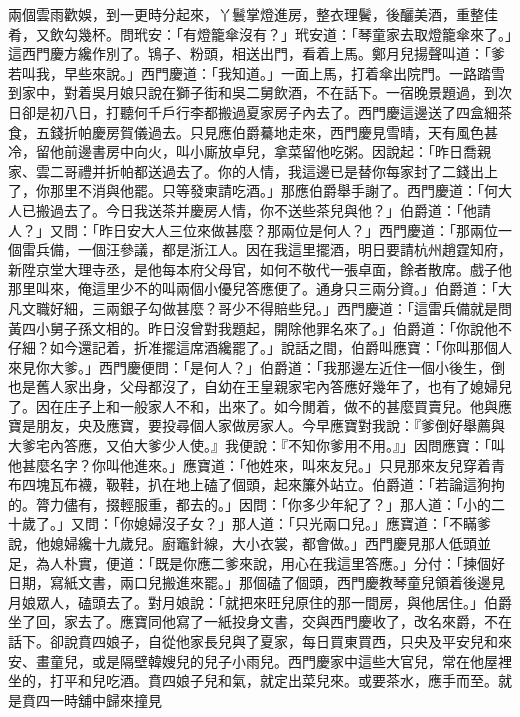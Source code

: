 \begin{showcontents}{}
兩個雲雨歡娛，到一更時分起來，丫鬟掌燈進房，整衣理鬢，後釃美酒，重整佳肴，又飲勾幾杯。問玳安：「有燈籠傘沒有？」玳安道：「琴童家去取燈籠傘來了。」這西門慶方纔作別了。鴇子、粉頭，相送出門，看着上馬。鄭月兒揚聲叫道：「爹若叫我，早些來說。」西門慶道：「我知道。」一面上馬，打着傘出院門。一路踏雪到家中，對着吳月娘只說在獅子街和吳二舅飲酒，不在話下。一宿晚景題過，到次日卻是初八日，打聽何千戶行李都搬過夏家房子內去了。西門慶這邊送了四盒細茶食，五錢折帕慶房賀儀過去。只見應伯爵驀地走來，西門慶見雪晴，天有風色甚冷，留他前邊書房中向火，叫小廝放卓兒，拿菜留他吃粥。因說起：「昨日喬親家、雲二哥禮并折帕都送過去了。你的人情，我這邊已是替你每家封了二錢出上了，你那里不消與他罷。只等發柬請吃酒。」那應伯爵舉手謝了。西門慶道：「何大人已搬過去了。今日我送茶并慶房人情，你不送些茶兒與他？」伯爵道：「他請人？」又問：「昨日安大人三位來做甚麼？那兩位是何人？」西門慶道：「那兩位一個雷兵備，一個汪參議，都是浙江人。因在我這里擺酒，明日要請杭州趙霆知府，新陞京堂大理寺丞，是他每本府父母官，如何不敬代一張卓面，餘者散席。戲子他那里叫來，俺這里少不的叫兩個小優兒答應便了。通身只三兩分資。」伯爵道：「大凡文職好細，三兩銀子勾做甚麼？哥少不得賠些兒。」西門慶道：「這雷兵備就是問黃四小舅子孫文相的。昨日沒曾對我題起，開除他罪名來了。」伯爵道：「你說他不仔細？如今還記着，折准擺這席酒纔罷了。」說話之間，伯爵叫應寶：「你叫那個人來見你大爹。」西門慶便問：「是何人？」伯爵道：「我那邊左近住一個小後生，倒也是舊人家出身，父母都沒了，自幼在王皇親家宅內答應好幾年了，也有了媳婦兒了。因在庄子上和一般家人不和，出來了。如今閒着，做不的甚麼買賣兒。他與應寶是朋友，央及應寶，要投尋個人家做房家人。今早應寶對我說：『爹倒好舉薦與大爹宅內答應，又伯大爹少人使。』我便說：『不知你爹用不用。』」因問應寶：「叫他甚麼名字？你叫他進來。」應寶道：「他姓來，叫來友兒。」只見那來友兒穿着青布四塊瓦布襪，靸鞋，扒在地上磕了個頭，起來簾外站立。伯爵道：「若論這狗拘的。膂力儘有，掇輕服重，都去的。」因問：「你多少年紀了？」那人道：「小的二十歲了。」又問：「你媳婦沒子女？」那人道：「只光兩口兒。」應寶道：「不瞞爹說，他媳婦纔十九歲兒。廚竈針線，大小衣裳，都會做。」西門慶見那人低頭並足，為人朴實，便道：「既是你應二爹來說，用心在我這里答應。」分付：「揀個好日期，寫紙文書，兩口兒搬進來罷。」那個磕了個頭，西門慶教琴童兒領着後邊見月娘眾人，磕頭去了。對月娘說：「就把來旺兒原住的那一間房，與他居住。」伯爵坐了回，家去了。應寶同他寫了一紙投身文書，交與西門慶收了，改名來爵，不在話下。卻說賁四娘子，自從他家長兒與了夏家，每日買東買西，只央及平安兒和來安、畫童兒，或是隔壁韓嫂兒的兒子小雨兒。西門慶家中這些大官兒，常在他屋裡坐的，打平和兒吃酒。賁四娘子兒和氣，就定出菜兒來。或要茶水，應手而至。就是賁四一時舖中歸來撞見 
\end{showcontents}
